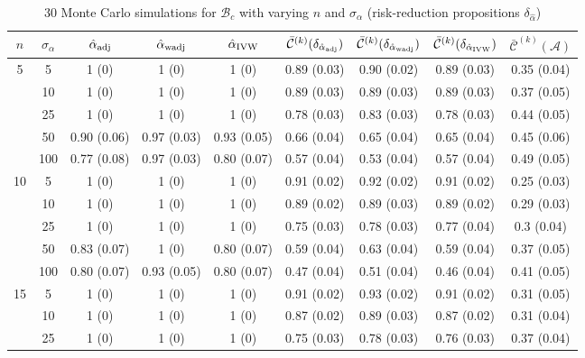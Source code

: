 \documentclass[11pt]{article}
\def\mc#1{\mathcal{#1}} %
\theoremstyle{definition}
\begin{document}
\begin{table}[t]
\caption{30 Monte Carlo simulations for $\mc{B}_c$ with varying $n$ and $\sigma_{\alpha}$ (risk-reduction propositions $\delta_{\hat{\alpha}}$)} \vspace{.2cm} \label{table1}
\begin{center}
\begin{tabular}{cc|ccc|cccc}
 $n$   & $\sigma_{\alpha}$ &  $\hat{\alpha}_{\rm adj}$  & $\hat{\alpha}_{\rm wadj}$ & $\hat{\alpha}_{\rm IVW}$  & $\bar{\mc{C}}^{(k)}(\delta_{\hat{\alpha}_{\rm adj}})$  & $\bar{\mc{C}}^{(k)}(\delta_{\hat{\alpha}_{\rm wadj}})$ & $\bar{\mc{C}}^{(k)}(\delta_{\hat{\alpha}_{\rm IVW}})$ &  $\bar{\mc{C}}^{(k)}(\mc{A})$ \\[.15cm]  
  \hline
  \multirow{5}{*}{5} & 5  & 1 (0) & 1 (0) & 1 (0) & 0.89 (0.03) & 0.90 (0.02) & 0.89 (0.03) & 0.35 (0.04) \\ 
  & 10  & 1 (0) & 1 (0) & 1 (0) & 0.89 (0.03) & 0.89 (0.03) & 0.89 (0.03) & 0.37 (0.05) \\ 
  & 25  & 1 (0) & 1 (0) & 1 (0) & 0.78 (0.03) & 0.83 (0.03) & 0.78 (0.03) & 0.44 (0.05) \\ 
  & 50  & 0.90 (0.06) & 0.97 (0.03) & 0.93 (0.05) & 0.66 (0.04) & 0.65 (0.04) & 0.65 (0.04) & 0.45 (0.06) \\ 
  & 100  & 0.77 (0.08) & 0.97 (0.03) & 0.80 (0.07) & 0.57 (0.04) & 0.53 (0.04) & 0.57 (0.04) & 0.49 (0.05) \\[.3cm]  
  \multirow{5}{*}{10} & 5  & 1 (0) & 1 (0) & 1 (0) & 0.91 (0.02) & 0.92 (0.02) & 0.91 (0.02) & 0.25 (0.03) \\ 
  & 10  & 1 (0) & 1 (0) & 1 (0) & 0.89 (0.02) & 0.89 (0.03) & 0.89 (0.02) & 0.29 (0.03) \\ 
  & 25  & 1 (0) & 1 (0) & 1 (0) & 0.75 (0.03) & 0.78 (0.03) & 0.77 (0.04) & 0.3 (0.04) \\ 
  & 50  & 0.83 (0.07) & 1 (0) & 0.80 (0.07) & 0.59 (0.04) & 0.63 (0.04) & 0.59 (0.04) & 0.37 (0.05) \\ 
  & 100  & 0.80 (0.07) & 0.93 (0.05) & 0.80 (0.07) & 0.47 (0.04) & 0.51 (0.04) & 0.46 (0.04) & 0.41 (0.05) \\[.3cm]  
  \multirow{5}{*}{15} & 5  & 1 (0) & 1 (0) & 1 (0) & 0.91 (0.02) & 0.93 (0.02) & 0.91 (0.02) & 0.31 (0.05) \\ 
  & 10  & 1 (0) & 1 (0) & 1 (0) & 0.87 (0.02) & 0.89 (0.03) & 0.87 (0.02) & 0.31 (0.04) \\ 
 & 25  & 1 (0) & 1 (0) & 1 (0) & 0.75 (0.03) & 0.78 (0.03) & 0.76 (0.03) & 0.37 (0.04) \\ 

\end{tabular}
\end{center}
\end{table}
\end{document}

